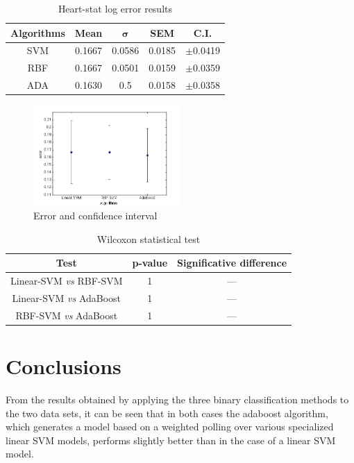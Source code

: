 \documentclass[10pt, journal]{IEEEtran}
\begin{document}
\begin{table}[ht!]
	\centering
	\begin{tabular}{|c|c|c|c|c|}
		\hline
		\textbf{Algorithms} & \textbf{Mean} & $\mathbf{\sigma}$ & \textbf{SEM} & \textbf{C.I.}\\\hline
		SVM & 0.1667 & 0.0586 & 0.0185 & $\pm$0.0419\\\hline
		RBF & 0.1667 & 0.0501 & 0.0159 & $\pm$0.0359\\\hline
		ADA & 0.1630 & 0.5 & 0.0158 & $\pm$0.0358\\\hline
	\end{tabular}
	\label{tab:heartErrorComparison}
	\caption{Heart-stat log error results}
\end{table}

\begin{figure}[ht!]
	\centering
	\includegraphics[width=0.5\textwidth]{img/heartLogAnalisy}
	\caption{Error and confidence interval}
	\label{fig:heartLogAnalisy}
\end{figure}


\begin{table}[ht!]
	\centering
	\begin{tabular}{|c|c|c|}
		\hline
		\textbf{Test} & \textbf{p-value} & \textbf{Significative difference}\\\hline
		Linear-SVM \emph{vs} RBF-SVM & 1 & —\\\hline
		Linear-SVM \emph{vs} AdaBoost & 1 & —\\\hline
		RBF-SVM \emph{vs} AdaBoost & 1 & —\\\hline
	\end{tabular}
	\label{tab:heartWilcoxonTest}
	\caption{Wilcoxon statistical test}
\end{table}



\section{Conclusions} %
\label{sec:conclusions}
From the results obtained by applying the three binary classification methods to the two data sets, it can be seen that in both cases the adaboost algorithm, which generates a model based on a weighted polling over various specialized linear SVM models, performs slightly better than in the case of a linear SVM model.\\
\end{document}
